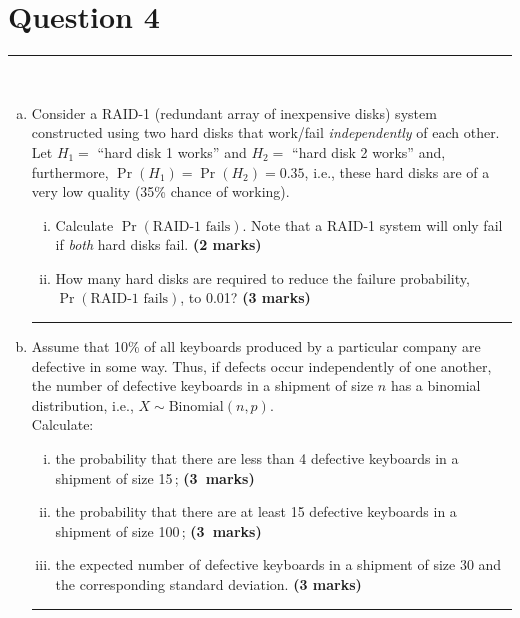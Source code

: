 \documentclass[12pt]{article}
\begin{document}
\section*{Question 4 }
\noindent\rule{\linewidth}{1pt}
\quad\\[-0.5cm]
\begin{enumerate}[a)]
\item Consider a RAID-1 (redundant array of inexpensive disks) system constructed using two hard disks that work/fail \emph{independently} of each other. Let $H_1 =$ ``hard disk 1 works'' and $H_2 =$ ``hard disk 2 works'' and, furthermore, $\Pr(H_1) = \Pr(H_2) = 0.35$, i.e., these hard disks are of a very low quality (35\% chance of working).
    \begin{enumerate}[i)]\itemsep0.3cm
    \item Calculate $\Pr(\text{RAID-1 fails})$. Note that a RAID-1 system will only fail if \emph{both} hard disks fail. \hfill{\scriptsize \bf (2 marks)}
    \item How many hard disks are required to reduce the failure  probability, $\Pr(\text{RAID-1 fails})$, to 0.01? \hfill{\scriptsize \bf (3 marks)}
    \end{enumerate}
\begin{center}\noindent\rule{0.4\linewidth}{0.5pt}\end{center}
\item Assume that 10\% of all keyboards produced by a particular company are defective in some way. Thus, if defects occur independently of one another, the number of defective keyboards in a shipment of size $n$ has a binomial distribution, i.e., $X \sim \text{Binomial}(n,p)$.\\[0.3cm]
    Calculate:
    \begin{enumerate}[i)]\itemsep0.3cm
    \item the probability that there are less than 4 defective keyboards in a shipment of size 15\,; \hfill{\mbox{\scriptsize \bf (3 marks)}}
    \item the probability that there are at least 15 defective keyboards in a shipment of size 100\,; \hfill{\mbox{\scriptsize \bf (3 marks)}}
    \item the expected number of defective keyboards in a shipment of size 30 and the corresponding standard deviation. \hfill{\scriptsize \bf (3 marks)}
    \end{enumerate}
    \begin{center}\noindent\rule{0.4\linewidth}{0.5pt}\end{center}

\end{enumerate}
\end{document}
